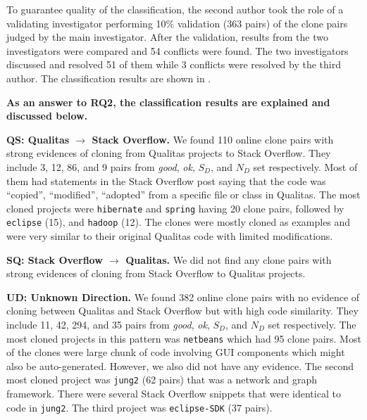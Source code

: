 \documentclass[sigconf,review, anonymous]{acmart}
\begin{document}
To guarantee quality of the classification, the second author took the role of a validating investigator performing 10\% validation (363 pairs) of the clone pairs judged by the main investigator. After the validation, results from the two investigators were compared and 54 conflicts were found. The two investigators discussed and resolved 51 of them while 3 conflicts were resolved by the third author. The classification results are shown in . 

\textbf{As an answer to RQ2, the classification results are explained and discussed below.}

\textbf{QS: Qualitas $\rightarrow$ Stack Overflow.} We found 110 online clone pairs with strong evidences of cloning from Qualitas projects to Stack Overflow. They include 3, 12, 86, and 9 pairs from \textit{good}, \textit{ok}, $S_D$, and $N_D$ set respectively. Most of them had statements in the Stack Overflow post saying that the code was ``copied'', ``modified'', ``adopted'' from a specific file or class in Qualitas. The most cloned projects were \texttt{hibernate} and \texttt{spring} having 20 clone pairs, followed by \texttt{eclipse} (15), and \texttt{hadoop} (12). The clones were mostly cloned as examples and were very similar to their original Qualitas code with limited modifications.

\textbf{SQ: Stack Overflow $\rightarrow$ Qualitas.} We did not find any clone pairs with strong evidences of cloning from Stack Overflow to Qualitas projects.

\textbf{UD: Unknown Direction.} We found 382 online clone pairs with no evidence of cloning between Qualitas and Stack Overflow but with high code similarity. They include 11, 42, 294, and 35 pairs from \textit{good}, \textit{ok}, $S_D$, and $N_D$ set respectively. The most cloned projects in this pattern was {\small{\texttt{netbeans}}} which had 95 clone pairs. Most of the clones were large chunk of code involving GUI components which might also be auto-generated. However, we also did not have any evidence. The second most cloned project was {\small{\texttt{jung2}}} (62 pairs) that was a network and graph framework. There were several Stack Overflow snippets that were identical to code in {\small{\texttt{jung2}}}. The third project was {\small{\texttt{eclipse-SDK}}} (37 pairs).
\end{document}
